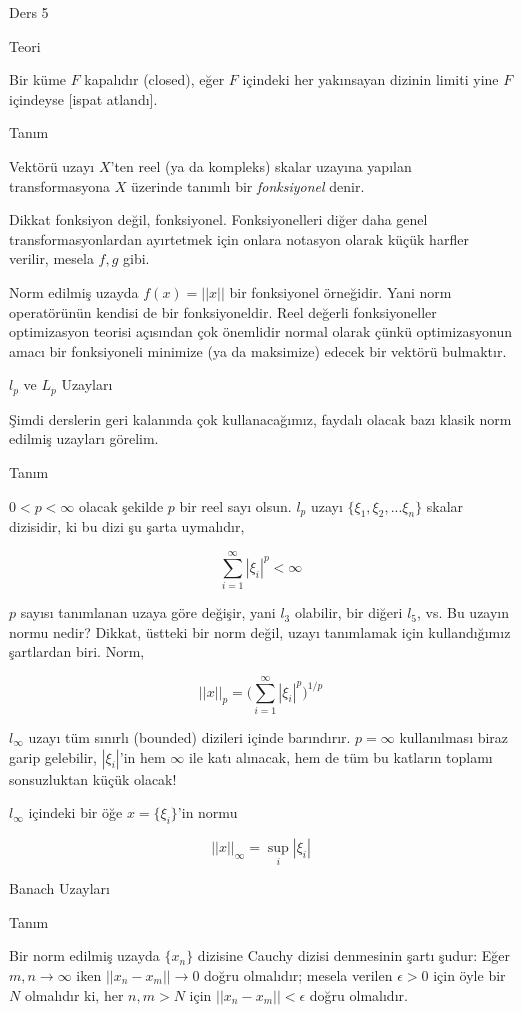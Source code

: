 \documentclass[12pt,fleqn]{article}\usepackage{../../common}
\begin{document}
Ders 5

Teori 

Bir küme $F$ kapalıdır (closed), eğer $F$ içindeki her yakınsayan dizinin
limiti yine $F$ içindeyse [ispat atlandı]. 

Tanım 

Vektörü uzayı $X$'ten reel (ya da kompleks) skalar uzayına yapılan
transformasyona $X$ üzerinde tanımlı bir {\em fonksiyonel} denir. 

Dikkat fonksiyon değil, fonksiyonel. Fonksiyonelleri diğer daha genel
transformasyonlardan ayırtetmek için onlara notasyon olarak küçük harfler
verilir, mesela $f,g$ gibi. 

Norm edilmiş uzayda $f(x) = ||x||$ bir fonksiyonel örneğidir. Yani norm
operatörünün kendisi de bir fonksiyoneldir. Reel değerli fonksiyoneller
optimizasyon teorisi açısından çok önemlidir normal olarak çünkü
optimizasyonun amacı bir fonksiyoneli minimize (ya da maksimize) edecek bir
vektörü bulmaktır. 

$l_p$ ve $L_p$ Uzayları 

Şimdi derslerin geri kalanında çok kullanacağımız, faydalı olacak bazı
klasik norm edilmiş uzayları görelim. 

Tanım 

$0 < p < \infty$ olacak şekilde $p$ bir reel sayı olsun. $l_p$ uzayı $\{
\xi_1,\xi_2,...\xi_n\}$ skalar dizisidir, ki bu dizi şu şarta uymalıdır,

$$ \sum_{i=1}^{\infty} |\xi_i|^p < \infty $$

$p$ sayısı tanımlanan uzaya göre değişir, yani $l_3$ olabilir, bir diğeri
$l_5$, vs. Bu uzayın normu nedir? Dikkat, üstteki bir norm değil, uzayı
tanımlamak için kullandığımız şartlardan biri. Norm, 

$$ ||x||_p = \bigg( \sum_{i=1}^\infty |\xi_i|^p \bigg)^{1/p}  $$

$l_\infty$ uzayı tüm sınırlı (bounded) dizileri içinde barındırır. $p =
\infty$ kullanılması biraz garip gelebilir, $|\xi_i|$'in hem $\infty$ ile 
katı alınacak, hem de tüm bu katların toplamı sonsuzluktan küçük olacak! 

$l_\infty$ içindeki bir öğe $x = \{ \xi_i \}$'in normu 

$$ ||x||_\infty = \sup_i |\xi_i| $$

Banach Uzayları 

Tanım

Bir norm edilmiş uzayda $\{x_n\}$ dizisine Cauchy dizisi denmesinin şartı şudur:
Eğer $m,n \to \infty$ iken $||x_n - x_m|| \to 0$ doğru olmalıdır; mesela verilen $\epsilon > 0$
için öyle  bir $N$ olmalıdır ki, her $n,m > N$ için $||x_n - x_m|| < \epsilon$ doğru
olmalıdır.
\end{document}
